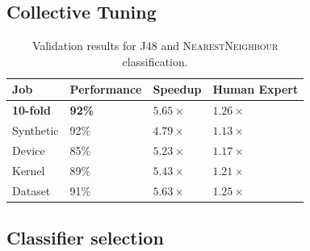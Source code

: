 \documentclass[nonatbib,preprint,9pt]{sigplanconf}
\begin{document}
\subsection{Collective Tuning}

\begin{table}
\scriptsize
\centering
\begin{tabular}{llll}
\toprule
              Job &    Performance &            Speedup &       Human Expert \\
\midrule
\textbf{10-fold} & \textbf{92\%} & \textbf{$5.65\times$} & \textbf{$1.26\times$} \\
        Synthetic &           92\% &       $4.79\times$ &       $1.13\times$ \\
           Device &           85\% &       $5.23\times$ &       $1.17\times$ \\
           Kernel &           89\% &       $5.43\times$ &       $1.21\times$ \\
          Dataset &           91\% &       $5.63\times$ &       $1.25\times$ \\
\bottomrule
\end{tabular}
\caption{Validation results for J48 and \textsc{NearestNeighbour}
  classification.}
\label{tab:class}
\end{table}


\subsection{Classifier selection}
\end{document}
